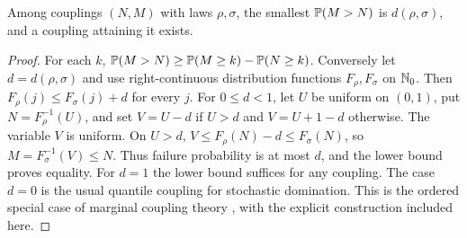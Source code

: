 \documentclass[11pt]{article}
\numberwithin{equation}{section}
\theoremstyle{definition}
\theoremstyle{remark}
\begin{document}
\begin{lemma}\label{lem:countcoupling}
Among couplings $(N,M)$ with laws $\rho,\sigma$, the smallest $\mathbb P(M>N)$ is $d(\rho,\sigma)$, and a coupling attaining it exists.
\end{lemma}
\begin{proof}
For each $k$, $\mathbb P(M>N)\ge\mathbb P(M\ge k)-\mathbb P(N\ge k)$. Conversely let $d=d(\rho,\sigma)$ and use right-continuous distribution functions $F_\rho,F_\sigma$ on $\mathbb N_0$. Then $F_\rho(j)\le F_\sigma(j)+d$ for every $j$. For $0\le d<1$, let $U$ be uniform on $(0,1)$, put $N=F_\rho^{-1}(U)$, and set $V=U-d$ if $U>d$ and $V=U+1-d$ otherwise. The variable $V$ is uniform. On $U>d$, $V\le F_\rho(N)-d\le F_\sigma(N)$, so $M=F_\sigma^{-1}(V)\le N$. Thus failure probability is at most $d$, and the lower bound proves equality. For $d=1$ the lower bound suffices for any coupling. The case $d=0$ is the usual quantile coupling for stochastic domination. This is the ordered special case of marginal coupling theory \cite{Strassen1965}, with the explicit construction included here.
\end{proof}
\end{document}
